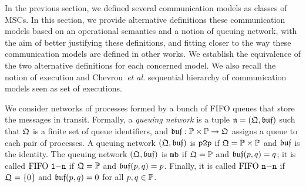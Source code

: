
In the previous section, we defined several communication models
as classes of MSCs. 
In this section, we provide alternative definitions these 
communication models
based on an operational semantics and a notion of queuing network, with the aim of better justifying these definitions, and fitting closer to the way these communication models are defined in other works. We establish the equivalence
of the two alternative definitions for each concerned model. We also recall the notion of
execution and Chevrou~\emph{et al.} sequential hierarchy of communication models seen as set of
executions.


We consider networks of processes formed by a bunch of FIFO queues that store the messages in transit.
Formally, a \emph{queuing network} is a tuple $\mathfrak{n}=(\mathfrak{Q},\mathfrak{buf})$ such that
$\mathfrak{Q}$ is a finite set of queue identifiers, and
$\mathfrak{buf}:\mathbb{P}\times\mathbb{P}\to \mathfrak{Q}$ assigns a queue to each
pair of processes.
A queuing network $(\mathfrak{Q},\mathfrak{buf})$ is $\mathtt{p2p}$ if
$\mathfrak{Q}=\mathbb{P}\times\mathbb{P}$ and $\mathfrak{buf}$ is the identity.
The queuing network $(\mathfrak{Q},\mathfrak{buf})$ is $\mathtt{mb}$ if
$\mathfrak{Q}=\mathbb{P}$ and $\mathfrak{buf}(p,q)=q$; it is called $\text{FIFO } \mathtt{1\mathsf{-}n}$ if
$\mathfrak{Q}=\mathbb{P}$ and $\mathfrak{buf}(p,q)=p$. Finally, it is called
$\text{FIFO } \mathtt{n\mathsf{-}n}$ if $\mathfrak{Q}=\{0\}$ and $\mathfrak{buf}(p,q)=0$ for all $p,q\in\mathbb{P}$.

